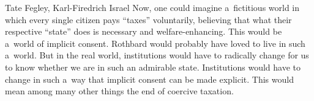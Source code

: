 \begin{artengenv2auth}{Tate Fegley, Karl-Firedrich Israel}
Now, one could imagine a~fictitious world in which every single citizen pays ``taxes'' voluntarily, believing that what their respective ``state'' does is necessary and welfare-enhancing. This would be a~world of implicit consent. Rothbard would probably have loved to live in such a~world. But in the real world, institutions would have to radically change for us to know whether we are in such an admirable state. Institutions would have to change in such a~way that implicit consent can be made explicit. This would mean among many other things the end of coercive taxation.


\end{artengenv2auth}

